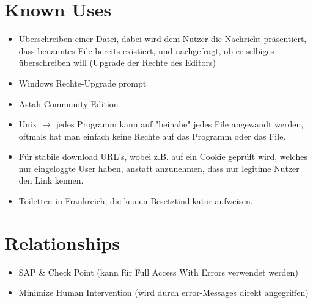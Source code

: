 \section{Known Uses}
\begin{itemize}
  \item Überschreiben einer Datei, dabei wird dem Nutzer die Nachricht präsentiert, dass benanntes File bereits existiert, und nachgefragt, ob er selbiges überschreiben will (Upgrade der Rechte des Editors)
  \item Windows Rechte-Upgrade prompt
  \item Astah Community Edition
  \item Unix $\to$ jedes Programm kann auf "beinahe" jedes File angewandt werden, oftmals hat man einfach keine Rechte auf das Programm oder das File.
  \item Für stabile download URL's, wobei z.B. auf ein Cookie geprüft wird, welches nur eingeloggte User haben, anstatt anzunehmen, dass nur legitime Nutzer den Link kennen.
  \item Toiletten in Frankreich, die keinen Besetztindikator aufweisen.
\end{itemize}

\section{Relationships}
\begin{itemize}
  \item SAP \& Check Point (kann für Full Access With Errors verwendet werden)
  \item Minimize Human Intervention (wird durch error-Messages direkt angegriffen)
\end{itemize}

